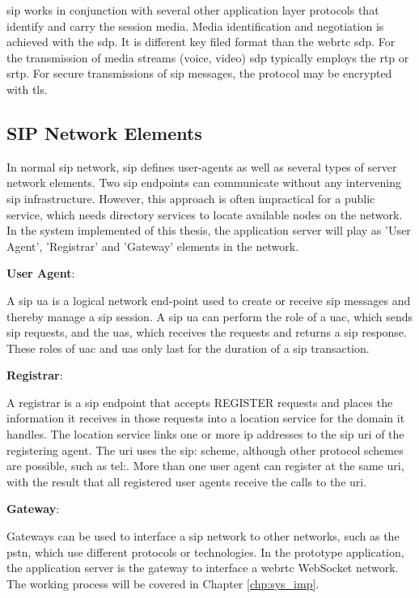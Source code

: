 \par \gls{sip} works in conjunction with several other application layer protocols that identify and carry the session media. Media identification and negotiation is achieved with the \gls{sdp}. It is different key filed format than the \gls{webrtc} \gls{sdp}. For the transmission of media streams (voice, video) \gls{sdp} typically employs the \gls{rtp} or \gls{srtp}. For secure transmissions of \gls{sip} messages, the protocol may be encrypted with \gls{tls}.

\subsection{SIP Network Elements}
\noindent In normal \gls{sip} network, \gls{sip} defines user-agents as well as several types of server network elements. Two \gls{sip} endpoints can communicate without any intervening \gls{sip} infrastructure. However, this approach is often impractical for a public service, which needs directory services to locate available nodes on the network. In the system implemented of this thesis, the application server will play as 'User Agent', 'Registrar' and 'Gateway' elements in the network.

\noindent \textbf{User Agent}\cite{wiki:sip}:
\par A \gls{sip} \gls{ua} is a logical network end-point used to create or receive \gls{sip} messages and thereby manage a \gls{sip} session. A \gls{sip} \gls{ua} can perform the role of a \gls{uac}, which sends \gls{sip} requests, and the \gls{uas}, which receives the requests and returns a \gls{sip} response. These roles of \gls{uac} and \gls{uas} only last for the duration of a \gls{sip} transaction.

\noindent \textbf{Registrar}\cite{wiki:sip}:
\par A registrar is a \gls{sip} endpoint that accepts REGISTER requests and places the information it receives in those requests into a location service for the domain it handles. The location service links one or more \gls{ip} addresses to the \gls{sip} \gls{uri} of the registering agent. The \gls{uri} uses the sip: scheme, although other protocol schemes are possible, such as tel:. More than one user agent can register at the same \gls{uri}, with the result that all registered user agents receive the calls to the \gls{uri}.

\noindent \textbf{Gateway}\cite{wiki:sip}:
\par Gateways can be used to interface a \gls{sip} network to other networks, such as the \gls{pstn}, which use different protocols or technologies. In the prototype application, the application server is the gateway to interface a \gls{webrtc} WebSocket network. The working process will be covered in Chapter \ref{chp:sys_imp}.

